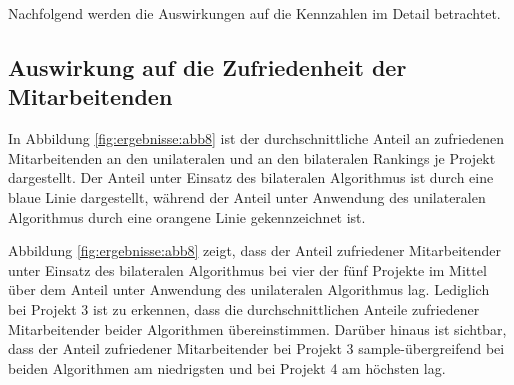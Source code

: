 Nachfolgend werden die Auswirkungen auf die Kennzahlen im Detail betrachtet.

\subsection{Auswirkung auf die Zufriedenheit der Mitarbeitenden}
In Abbildung \ref{fig:ergebnisse:abb8} ist der durchschnittliche Anteil an zufriedenen Mitarbeitenden an den unilateralen und an den bilateralen Rankings je Projekt dargestellt.
Der Anteil unter Einsatz des bilateralen Algorithmus ist durch eine blaue Linie dargestellt, während der Anteil unter Anwendung des unilateralen Algorithmus durch eine orangene Linie gekennzeichnet ist.

Abbildung \ref{fig:ergebnisse:abb8} zeigt, dass der Anteil zufriedener Mitarbeitender unter Einsatz des bilateralen Algorithmus bei vier der fünf Projekte im Mittel über dem Anteil unter Anwendung des unilateralen Algorithmus lag.
Lediglich bei Projekt 3 ist zu erkennen, dass die durchschnittlichen Anteile zufriedener Mitarbeitender beider Algorithmen übereinstimmen.
Darüber hinaus ist sichtbar, dass der Anteil zufriedener Mitarbeitender bei Projekt 3 sample-übergreifend bei beiden Algorithmen am niedrigsten und bei Projekt 4 am höchsten lag.

